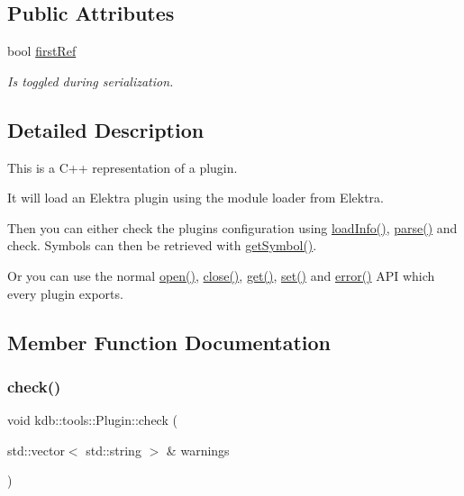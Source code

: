 \subsection*{Public Attributes}
\begin{DoxyCompactItemize}
\item 
bool \hyperlink{classkdb_1_1tools_1_1Plugin_aee8ae2b5708c74d4ccdc1bf9e8794636}{first\+Ref}
\begin{DoxyCompactList}\small\item\em Is toggled during serialization. \end{DoxyCompactList}\end{DoxyCompactItemize}


\subsection{Detailed Description}
This is a C++ representation of a plugin. 

It will load an Elektra plugin using the module loader from Elektra.

Then you can either check the plugins configuration using \hyperlink{classkdb_1_1tools_1_1Plugin_a3a0c6a956d1714002ef9baf8c9d99167}{load\+Info()}, \hyperlink{classkdb_1_1tools_1_1Plugin_adfcba2fbdeb436a1083410df804d5fb0}{parse()} and check. Symbols can then be retrieved with \hyperlink{classkdb_1_1tools_1_1Plugin_aca31140802ab463d5bddd95dee73194d}{get\+Symbol()}.

Or you can use the normal \hyperlink{classkdb_1_1tools_1_1Plugin_a680a490123b5290441d76ef2c1e3f1fa}{open()}, \hyperlink{classkdb_1_1tools_1_1Plugin_a40b5fd413f3f6da735680ed8d7c8a6a2}{close()}, \hyperlink{classkdb_1_1tools_1_1Plugin_a2aa6ff55f9cf81a59d2a8d271fe68e0f}{get()}, \hyperlink{classkdb_1_1tools_1_1Plugin_abf84d512b48f6fa1b89636217537cde0}{set()} and \hyperlink{classkdb_1_1tools_1_1Plugin_a8ec348b49a34ef17fda64cb289b8cf64}{error()} A\+PI which every plugin exports. 

\subsection{Member Function Documentation}
\mbox{\label{classkdb_1_1tools_1_1Plugin_a5bb3db65b9d87d18787da8cc65eaca65}} 
\subsubsection{\texorpdfstring{check()}{check()}}
{\footnotesize\ttfamily void kdb\+::tools\+::\+Plugin\+::check (\begin{DoxyParamCaption}\item[{std\+::vector$<$ std\+::string $>$ \&}]{warnings }\end{DoxyParamCaption})}



